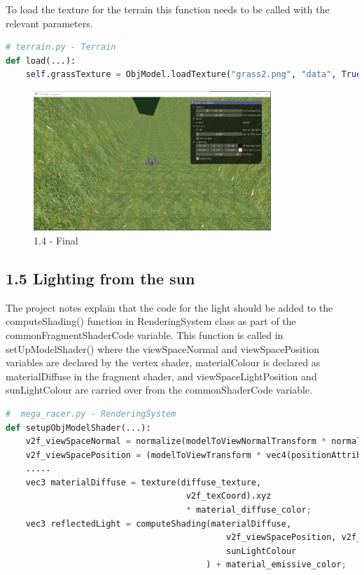 \documentclass[a4 paper, 12pt]{article}
\begin{document}
To load the texture for the terrain this function needs to be called with the relevant parameters.
    \begin{lstlisting}[language=python]   
# terrain.py - Terrain
def load(...):
    self.grassTexture = ObjModel.loadTexture("grass2.png", "data", True)
    \end{lstlisting}

\begin{figure} [H]
    \centering
    \includegraphics[width=0.8\textwidth, frame]
        {./images/1.4.PNG}
    \caption{1.4 - Final}
\end{figure}



\subsection{1.5 Lighting from the sun}  

The project notes explain that the code for the light should be added to the computeShading() function in RenderingSystem class as part of the commonFragmentShaderCode variable. This function is called in setUpModelShader() where the viewSpaceNormal and viewSpacePosition variables are declared by the vertex shader, materialColour is declared as materialDiffuse in the fragment shader, and viewSpaceLightPosition and sunLightColour are carried over from the commonShaderCode variable. 
    \begin{lstlisting}[language=python] 
#  mega_racer.py - RenderingSystem
def setupObjModelShader(...):
    v2f_viewSpaceNormal = normalize(modelToViewNormalTransform * normalAttribute);
    v2f_viewSpacePosition = (modelToViewTransform * vec4(positionAttribute, 1.0)).xyz;
    .....
    vec3 materialDiffuse = texture(diffuse_texture, 
                                    v2f_texCoord).xyz 
                                    * material_diffuse_color;
    vec3 reflectedLight = computeShading(materialDiffuse, 
                                            v2f_viewSpacePosition, v2f_viewSpaceNormal, viewSpaceLightPosition, 
                                            sunLightColour
                                        ) + material_emissive_color;
    \end{lstlisting}
\end{document}
